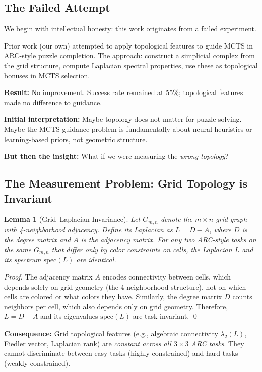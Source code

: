 \documentclass[11pt]{article}
\newtheorem{lemma}{Lemma}
\begin{document}
\subsection{The Failed Attempt}

We begin with intellectual honesty: this work originates from a failed experiment.

Prior work (our own) attempted to apply topological features to guide MCTS in ARC-style puzzle completion. The approach: construct a simplicial complex from the grid structure, compute Laplacian spectral properties, use these as topological bonuses in MCTS selection.

\textbf{Result:} No improvement. Success rate remained at 55\%; topological features made no difference to guidance.

\textbf{Initial interpretation:} Maybe topology does not matter for puzzle solving. Maybe the MCTS guidance problem is fundamentally about neural heuristics or learning-based priors, not geometric structure.

\textbf{But then the insight:} What if we were measuring the \emph{wrong topology}?

\subsection{The Measurement Problem: Grid Topology is Invariant}

\begin{lemma}[Grid--Laplacian Invariance]
\label{lem:grid-invariance}
Let $G_{m,n}$ denote the $m \times n$ grid graph with 4-neighborhood adjacency. Define its Laplacian as $L = D - A$, where $D$ is the degree matrix and $A$ is the adjacency matrix. For any two ARC-style tasks on the same $G_{m,n}$ that differ only by color constraints on cells, the Laplacian $L$ and its spectrum $\mathrm{spec}(L)$ are identical.
\end{lemma}

\begin{proof}
The adjacency matrix $A$ encodes connectivity between cells, which depends solely on grid geometry (the 4-neighborhood structure), not on which cells are colored or what colors they have. Similarly, the degree matrix $D$ counts neighbors per cell, which also depends only on grid geometry. Therefore, $L = D - A$ and its eigenvalues $\mathrm{spec}(L)$ are task-invariant. \qed
\end{proof}

\textbf{Consequence:} Grid topological features (e.g., algebraic connectivity $\lambda_2(L)$, Fiedler vector, Laplacian rank) are \emph{constant across all $3 \times 3$ ARC tasks}. They cannot discriminate between easy tasks (highly constrained) and hard tasks (weakly constrained).
\end{document}
